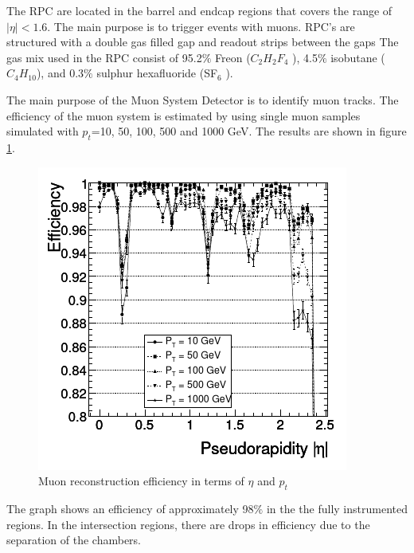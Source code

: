 The RPC are located in the barrel and endcap regions that covers the range of $|\eta|<1.6$. The main purpose is to trigger events with muons. 
RPC's are structured with a double gas filled gap and readout strips between the gaps
 The gas mix used in the RPC consist of 95.2$\%$ Freon
($C_2 H_2 F_4$ ), 4.5$\%$ isobutane ($C_4 H_{10}$), and 0.3$\%$ sulphur hexafluoride (SF$_6$ )\cite{cms7}.



The main purpose of the Muon System Detector is to identify muon tracks. 
The efficiency of the muon system is estimated by using single muon samples simulated with $p_t$=10, 50, 100, 500 and 1000 GeV. The results are shown in figure \ref{mu-efi}.
\begin{figure}
	\centering
	\includegraphics[width=0.6\linewidth]{Chapter2/mu-efi}
	\caption[Muon reconstruction efficiency in terms of $\eta$ and $p_t$]{Muon reconstruction efficiency in terms of $\eta$ and $p_t$\cite{cms-manual}}
	\label{mu-efi}
\end{figure}
The graph shows an efficiency of approximately 98$\%$ in the the fully instrumented regions. In the intersection regions, there are drops in efficiency due to the separation of the chambers. %
